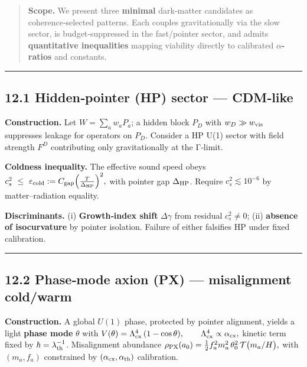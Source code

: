 \documentclass[
]{article}
\numberwithin{equation}{section}
\begin{document}
\begin{quote}
\textbf{Scope.} We present three \textbf{minimal} dark‑matter candidates
as coherence‑selected patterns. Each couples gravitationally via the
slow sector, is budget‑suppressed in the fast/pointer sector, and admits
\textbf{quantitative inequalities} mapping viability directly to
calibrated \textbf{\(\alpha\)-ratios} and constants.
\end{quote}

\begin{center}\rule{0.5\linewidth}{0.5pt}\end{center}

\hypertarget{hiddenpointer-hp-sector-cdmlike}{%
\subsection{12.1 Hidden‑pointer (HP) sector ---
CDM‑like}\label{hiddenpointer-hp-sector-cdmlike}}

\textbf{Construction.} Let \(W=\sum_a w_a P_a\); a hidden block \(P_D\)
with \(w_D\gg w_{\rm vis}\) suppresses leakage for operators on \(P_D\).
Consider a HP U(1) sector with field strength \(F^D\) contributing only
gravitationally at the Γ‑limit.

\textbf{Coldness inequality.} The effective sound speed obeys
\(c_s^2\ \le\ \varepsilon_{\rm cold}:=C_{\rm gap}\Big(\frac{T}{\Delta_{\rm HP}}\Big)^2,\)
with pointer gap \(\Delta_{\rm HP}\). Require \(c_s^2\lesssim10^{-6}\)
by matter--radiation equality.

\textbf{Discriminants.} (i) \textbf{Growth‑index shift} \(\Delta\gamma\)
from residual \(c_s^2\neq0\); (ii) \textbf{absence of isocurvature} by
pointer isolation. Failure of either falsifies HP under fixed
calibration.

\begin{center}\rule{0.5\linewidth}{0.5pt}\end{center}

\hypertarget{phasemode-axion-px-misalignment-coldwarm}{%
\subsection{12.2 Phase‑mode axion (PX) --- misalignment
cold/warm}\label{phasemode-axion-px-misalignment-coldwarm}}

\textbf{Construction.} A global \(U(1)\) phase, protected by pointer
alignment, yields a light \textbf{phase mode} \(\theta\) with
\(V(\theta)=\Lambda_{\rm cx}^4\,(1-\cos\theta),\qquad \Lambda_{\rm cx}^4\propto\alpha_{\rm cx},\)
kinetic term fixed by \(\hbar=\lambda_{\rm th}^{-1}\). Misalignment
abundance
\(\rho_{\rm PX}(a_0)=\tfrac12 f_a^2 m_a^2\,\theta_0^2\,\mathcal T\big(m_a/H\big),\)
with \((m_a,f_a)\) constrained by \((\alpha_{\rm cx},\alpha_{\rm th})\)
calibration.
\end{document}
